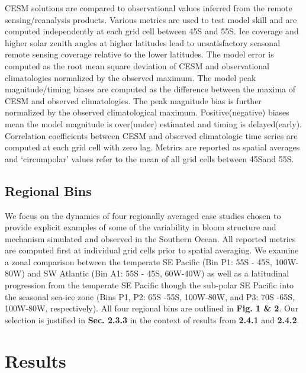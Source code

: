 CESM solutions are compared to observational values inferred from the remote sensing/reanalysis products. Various metrics are used to test model skill and are computed independently at each grid cell between 45\degree S and 55\degree S. Ice coverage and higher solar zenith angles at higher latitudes lead to unsatisfactory seasonal remote sensing coverage relative to the lower latitudes. The model error is computed as the root mean square deviation of CESM and observational climatologies normalized by the observed maximum. The model peak magnitude/timing biases are computed as the difference between the maxima of CESM and observed climatologies. The peak magnitude bias is further normalized by the observed climatological maximum. Positive(negative) biases mean the model magnitude is over(under) estimated and timing is delayed(early). Correlation coefficients between CESM and observed climatologic time series are computed at each grid cell with zero lag. Metrics are reported as spatial averages and `circumpolar' values refer to the mean of all grid cells between 45S\degree and 55S\degree.

\subsection{Regional Bins}

We focus on the dynamics of four regionally averaged case studies chosen to provide explicit examples of some of the variability in bloom structure and mechanism simulated and observed in the Southern Ocean. All reported metrics are computed first at individual grid cells prior to spatial averaging. We examine a zonal comparison between the temperate SE Pacific (Bin P1: 55\degree S - 45\degree S, 100\degree W-80\degree W) and SW Atlantic (Bin A1: 55\degree S - 45\degree S, 60\degree W-40\degree W) as well as a latitudinal progression from the temperate SE Pacific though the sub-polar SE Pacific into the seasonal sea-ice zone (Bins P1, P2: 65\degree S -55\degree S, 100\degree W-80\degree W, and P3: 70\degree S -65\degree S, 100\degree W-80\degree W, respectively). All four regional bins are outlined in \textbf{Fig. 1 \& 2}. Our selection is justified in \textbf{Sec. 2.3.3} in the context of results from \textbf{2.4.1} and \textbf{2.4.2}. 

\section{Results}


